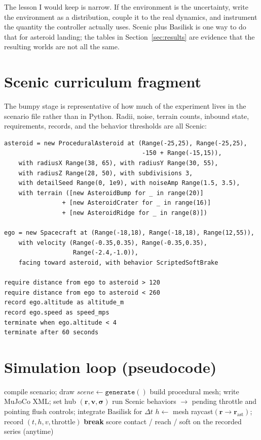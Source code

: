 \documentclass[10pt]{article}
\begin{document}
The lesson I would keep is narrow.
If the environment is the uncertainty, write the environment as a distribution, couple it to the real dynamics, and instrument the quantity the controller actually uses.
Scenic plus Basilisk is one way to do that for asteroid landing; the tables in Section~\ref{sec:results} are evidence that the resulting worlds are not all the same.




\appendix
\section{Scenic curriculum fragment}
\label{app:scenic}

The bumpy stage is representative of how much of the experiment lives in the scenario file rather than in Python.
Radii, noise, terrain counts, inbound state, requirements, records, and the behavior thresholds are all Scenic:

\begin{lstlisting}
asteroid = new ProceduralAsteroid at (Range(-25,25), Range(-25,25),
                                      -150 + Range(-15,15)),
    with radiusX Range(38, 65), with radiusY Range(30, 55),
    with radiusZ Range(28, 50), with subdivisions 3,
    with detailSeed Range(0, 1e9), with noiseAmp Range(1.5, 3.5),
    with terrain ([new AsteroidBump for _ in range(20)]
                + [new AsteroidCrater for _ in range(16)]
                + [new AsteroidRidge for _ in range(8)])

ego = new Spacecraft at (Range(-18,18), Range(-18,18), Range(12,55)),
    with velocity (Range(-0.35,0.35), Range(-0.35,0.35),
                   Range(-2.4,-1.0)),
    facing toward asteroid, with behavior ScriptedSoftBrake

require distance from ego to asteroid > 120
require distance from ego to asteroid < 260
record ego.altitude as altitude_m
record ego.speed as speed_mps
terminate when ego.altitude < 4
terminate after 60 seconds
\end{lstlisting}

\section{Simulation loop (pseudocode)}
\label{app:loop}

\begin{algorithm}[H]
\caption{One Path~A episode.}
\begin{algorithmic}[1]
\State compile scenario; draw $\textit{scene} \leftarrow \texttt{generate}()$
\State build procedural mesh; write MuJoCo XML; set hub $(\mathbf{r},\mathbf{v},\boldsymbol{\sigma})$
  \State run Scenic behaviors $\to$ pending throttle and pointing
  \State flush controls; integrate Basilisk for $\Delta t$
  \State $h \leftarrow$ mesh raycast$(\mathbf{r} \to \mathbf{r}_{\mathrm{ast}})$; record $(t,h,v,\text{throttle})$
   \textbf{break}
  \EndIf
\EndFor
\State score contact / reach / soft on the recorded series (anytime)
\end{algorithmic}
\end{algorithm}
\end{document}
